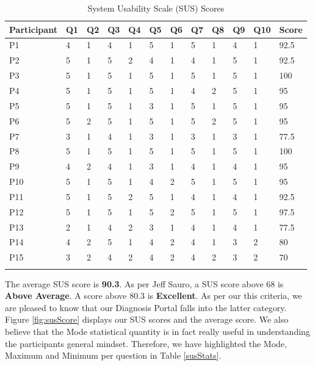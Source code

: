 \begin{longtable}{| p{} | p{} | p{} | p{} | p{} | p{} | p{} | p{} | p{} | p{} | p{} | p{} |} 
    \hline
    		\textbf{Participant}    &\textbf{Q1}    &\textbf{Q2}    &\textbf{Q3}    &\textbf{Q4}    &\textbf{Q5}    &\textbf{Q6}   &\textbf{Q7}    &\textbf{Q8}    &\textbf{Q9}    &\textbf{Q10}   &\textbf{Score} 
\\\hline
P1   &4   &1   &4   &1   &5   &1   &5   &1   &4   &1   &92.5 \\\hline
P2   &5   &1   &5   &2   &4   &1   &4   &1   &5   &1   &92.5 \\\hline
P3   &5   &1   &5   &1   &5   &1   &5   &1   &5   &1   &100 \\\hline
P4   &5   &1   &5   &1   &5   &1   &4   &2   &5   &1   &95 \\\hline
P5   &5   &1   &5   &1   &3   &1   &5   &1   &5   &1   &95 \\\hline
P6   &5   &2   &5   &1   &5   &1   &5   &2   &5   &1   &95 \\\hline
P7   &3   &1   &4   &1   &3   &1   &3   &1   &3   &1   &77.5 \\\hline
P8   &5   &1   &5   &1   &5   &1   &5   &1   &5   &1   &100 \\\hline
P9   &4   &2   &4   &1   &3   &1   &4   &1   &4   &1   &95 \\\hline
P10  &5   &1   &5   &1   &4   &2   &5   &1   &5   &1   &95 \\\hline
P11  &5   &1   &5   &2   &5   &1   &4   &1   &4   &1   &92.5 \\\hline
P12  &5   &1   &5   &1   &5   &2   &5   &1   &5   &1   &97.5 \\\hline
P13  &2   &1   &4   &2   &3   &1   &4   &1   &4   &1   &77.5 \\\hline
P14  &4   &2   &5   &1   &4   &2   &4   &1   &3   &2   &80 \\\hline
P15  &3   &2   &4   &2   &4   &2   &4   &2   &3   &2   &70 \\\hline
\caption{System Usability Scale (SUS) Scores} \label{susScores}
\end{longtable}


The average SUS score is \textbf{90.3}. As per Jeff Sauro, a SUS score above 68 is \textbf{Above Average}. A score above 80.3 is \textbf{Excellent}. As per our this criteria, we are pleased to know that our Diagnosis Portal falls into the latter category. Figure \ref{fig:susScore} displays our SUS scores and the average score. We also believe that the Mode statistical quantity is in fact really useful in understanding the participants general mindset. Therefore, we have highlighted the Mode, Maximum and Minimum per question in Table \ref{susStats}. 

